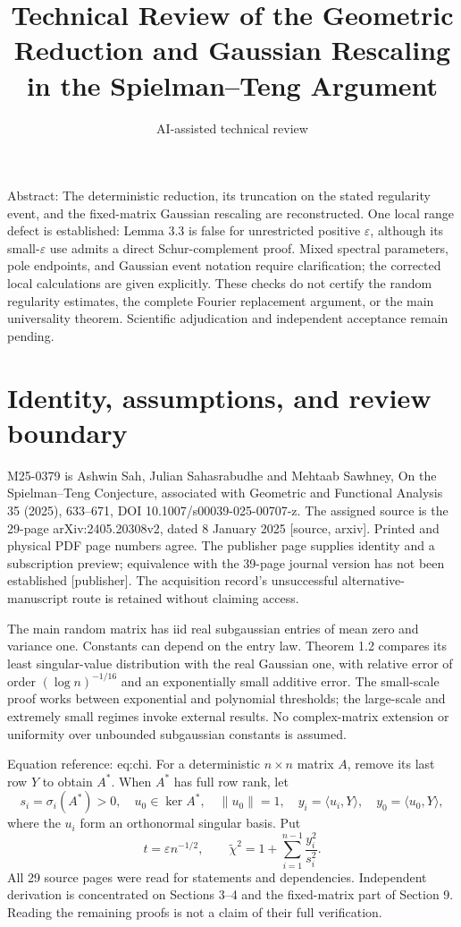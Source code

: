 \documentclass[10pt]{article}
\title{Technical Review of the Geometric Reduction and Gaussian Rescaling in the Spielman–Teng Argument}
\author{AI-assisted technical review}
\date{}
\begin{document}
\maketitle
Abstract: The deterministic reduction, its truncation on the stated regularity event, and the fixed-matrix Gaussian rescaling are reconstructed. One local range defect is established: Lemma 3.3 is false for unrestricted positive \(\varepsilon\), although its small-\(\varepsilon\) use admits a direct Schur-complement proof. Mixed spectral parameters, pole endpoints, and Gaussian event notation require clarification; the corrected local calculations are given explicitly. These checks do not certify the random regularity estimates, the complete Fourier replacement argument, or the main universality theorem. Scientific adjudication and independent acceptance remain pending.\par
\section*{Identity, assumptions, and review boundary}
M25-0379 is Ashwin Sah, Julian Sahasrabudhe and Mehtaab Sawhney, On the Spielman–Teng Conjecture, associated with Geometric and Functional Analysis 35 (2025), 633–671, DOI 10.1007/s00039-025-00707-z. The assigned source is the 29-page arXiv:2405.20308v2, dated 8 January 2025 [source, arxiv]. Printed and physical PDF page numbers agree. The publisher page supplies identity and a subscription preview; equivalence with the 39-page journal version has not been established [publisher]. The acquisition record’s unsuccessful alternative-manuscript route is retained without claiming access.\par
The main random matrix has iid real subgaussian entries of mean zero and variance one. Constants can depend on the entry law. Theorem 1.2 compares its least singular-value distribution with the real Gaussian one, with relative error of order \((\log n)^{-1/16}\) and an exponentially small additive error. The small-scale proof works between exponential and polynomial thresholds; the large-scale and extremely small regimes invoke external results. No complex-matrix extension or uniformity over unbounded subgaussian constants is assumed.\par
Equation reference: eq:chi. For a deterministic \(n\times n\) matrix \(A\), remove its last row \(Y\) to obtain \(A^*\). When \(A^*\) has full row rank, let \[s_i=\sigma_i(A^*)>0,\quad u_0\in\ker A^*,\quad \|u_0\|=1,\quad
y_i=\langle u_i,Y\rangle,\quad y_0=\langle u_0,Y\rangle,\] where the \(u_i\) form an orthonormal singular basis. Put \[t=\varepsilon n^{-1/2},\qquad
 \widetilde\chi^2=1+\sum_{i=1}^{n-1}\frac{y_i^2}{s_i^2}.
 \] All 29 source pages were read for statements and dependencies. Independent derivation is concentrated on Sections 3–4 and the fixed-matrix part of Section 9. Reading the remaining proofs is not a claim of their full verification.\par
\end{document}
